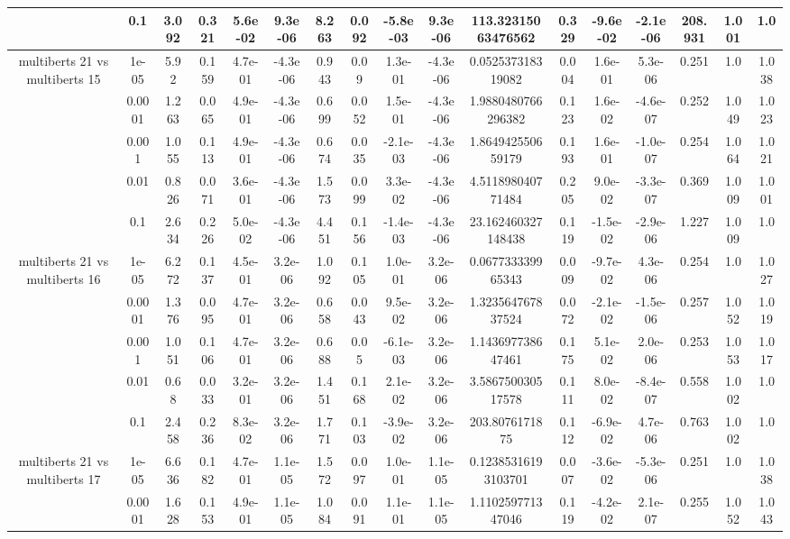 \begin{tabular}{|c|c|c|c|c|c|c|c|c|c|c|c|c|c|c|c|c|}
 & 0.1 & 3.092 & 0.321 & 5.6e-02 & 9.3e-06 & 8.263 & 0.092 & -5.8e-03 & 9.3e-06 & 113.32315063476562 & 0.329 & -9.6e-02 & -2.1e-06 & 208.931 & 1.001 & 1.0 \\
\hline
\multirow{5}{*}{multiberts 21 vs multiberts 15} & 1e-05 & 5.92 & 0.159 & 4.7e-01 & -4.3e-06 & 0.943 & 0.09 & 1.3e-01 & -4.3e-06 & 0.052537318319082 & 0.004 & 1.6e-01 & 5.3e-06 & 0.251 & 1.0 & 1.038 \\
 & 0.0001 & 1.263 & 0.065 & 4.9e-01 & -4.3e-06 & 0.699 & 0.052 & 1.5e-01 & -4.3e-06 & 1.9880480766296382 & 0.123 & 1.6e-02 & -4.6e-07 & 0.252 & 1.049 & 1.023 \\
 & 0.001 & 1.055 & 0.113 & 4.9e-01 & -4.3e-06 & 0.674 & 0.035 & -2.1e-03 & -4.3e-06 & 1.864942550659179 & 0.193 & 1.6e-01 & -1.0e-07 & 0.254 & 1.064 & 1.021 \\
 & 0.01 & 0.826 & 0.071 & 3.6e-01 & -4.3e-06 & 1.573 & 0.099 & 3.3e-02 & -4.3e-06 & 4.511898040771484 & 0.205 & 9.0e-02 & -3.3e-07 & 0.369 & 1.009 & 1.001 \\
 & 0.1 & 2.634 & 0.226 & 5.0e-02 & -4.3e-06 & 4.451 & 0.156 & -1.4e-03 & -4.3e-06 & 23.162460327148438 & 0.119 & -1.5e-02 & -2.9e-06 & 1.227 & 1.009 & 1.0 \\
\hline
\multirow{5}{*}{multiberts 21 vs multiberts 16} & 1e-05 & 6.272 & 0.137 & 4.5e-01 & 3.2e-06 & 1.092 & 0.105 & 1.0e-01 & 3.2e-06 & 0.067733339965343 & 0.009 & -9.7e-02 & 4.3e-06 & 0.254 & 1.0 & 1.027 \\
 & 0.0001 & 1.376 & 0.095 & 4.7e-01 & 3.2e-06 & 0.658 & 0.043 & 9.5e-02 & 3.2e-06 & 1.323564767837524 & 0.072 & -2.1e-02 & -1.5e-06 & 0.257 & 1.052 & 1.019 \\
 & 0.001 & 1.051 & 0.106 & 4.7e-01 & 3.2e-06 & 0.688 & 0.05 & -6.1e-03 & 3.2e-06 & 1.143697738647461 & 0.175 & 5.1e-02 & 2.0e-06 & 0.253 & 1.053 & 1.017 \\
 & 0.01 & 0.68 & 0.033 & 3.2e-01 & 3.2e-06 & 1.451 & 0.168 & 2.1e-02 & 3.2e-06 & 3.586750030517578 & 0.111 & 8.0e-02 & -8.4e-07 & 0.558 & 1.002 & 1.0 \\
 & 0.1 & 2.458 & 0.236 & 8.3e-02 & 3.2e-06 & 1.771 & 0.103 & -3.9e-02 & 3.2e-06 & 203.8076171875 & 0.112 & -6.9e-02 & 4.7e-06 & 0.763 & 1.002 & 1.0 \\
\hline
\multirow{5}{*}{multiberts 21 vs multiberts 17} & 1e-05 & 6.636 & 0.182 & 4.7e-01 & 1.1e-05 & 1.572 & 0.097 & 1.0e-01 & 1.1e-05 & 0.12385316193103701 & 0.007 & -3.6e-02 & -5.3e-06 & 0.251 & 1.0 & 1.038 \\
 & 0.0001 & 1.628 & 0.153 & 4.9e-01 & 1.1e-05 & 1.084 & 0.091 & 1.1e-01 & 1.1e-05 & 1.110259771347046 & 0.119 & -4.2e-02 & 2.1e-07 & 0.255 & 1.052 & 1.043 \\

\end{tabular}
